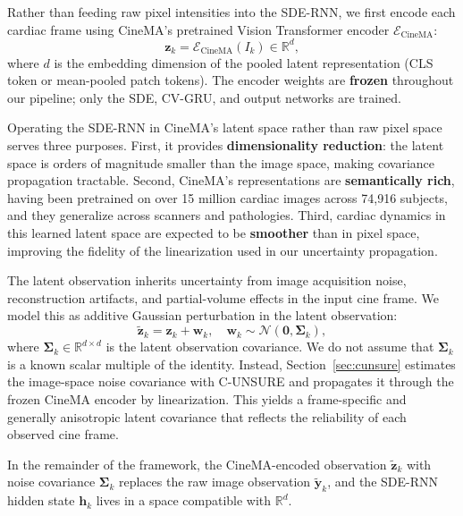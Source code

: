 \documentclass[10pt,twocolumn]{article}
\newcommand{\R}{\mathbb{R}}
\begin{document}
Rather than feeding raw pixel intensities into the SDE-RNN, we first encode each cardiac frame using CineMA's pretrained Vision Transformer encoder $\mathcal{E}_{\text{CineMA}}$:
\begin{equation}
    \bm{z}_k = \mathcal{E}_{\text{CineMA}}(I_k) \in \R^{d},
    \label{eq:cinema_encode}
\end{equation}
where $d$ is the embedding dimension of the pooled latent representation (CLS token or mean-pooled patch tokens). The encoder weights are \textbf{frozen} throughout our pipeline; only the SDE, CV-GRU, and output networks are trained.

Operating the SDE-RNN in CineMA's latent space rather than raw pixel space serves three purposes. First, it provides \textbf{dimensionality reduction}: the latent space is orders of magnitude smaller than the image space, making covariance propagation tractable. Second, CineMA's representations are \textbf{semantically rich}, having been pretrained on over 15 million cardiac images across 74,916 subjects, and they generalize across scanners and pathologies. Third, cardiac dynamics in this learned latent space are expected to be \textbf{smoother} than in pixel space, improving the fidelity of the linearization used in our uncertainty propagation.

The latent observation inherits uncertainty from image acquisition noise, reconstruction artifacts, and partial-volume effects in the input cine frame. We model this as additive Gaussian perturbation in the latent observation:
\begin{equation}
    \tilde{\bm{z}}_k = \bm{z}_k + \bm{w}_k, \quad \bm{w}_k \sim \mathcal{N}(\bm{0}, \bm{\Sigma}_k),
    \label{eq:obs_cinema}
\end{equation}
where $\bm{\Sigma}_k \in \R^{d \times d}$ is the latent observation covariance. We do not assume that $\bm{\Sigma}_k$ is a known scalar multiple of the identity. Instead, Section~\ref{sec:cunsure} estimates the image-space noise covariance with C-UNSURE and propagates it through the frozen CineMA encoder by linearization. This yields a frame-specific and generally anisotropic latent covariance that reflects the reliability of each observed cine frame.

In the remainder of the framework, the CineMA-encoded observation $\tilde{\bm{z}}_k$ with noise covariance $\bm{\Sigma}_k$ replaces the raw image observation $\tilde{\bm{y}}_k$, and the SDE-RNN hidden state $\bm{h}_k$ lives in a space compatible with $\R^d$.
\end{document}
